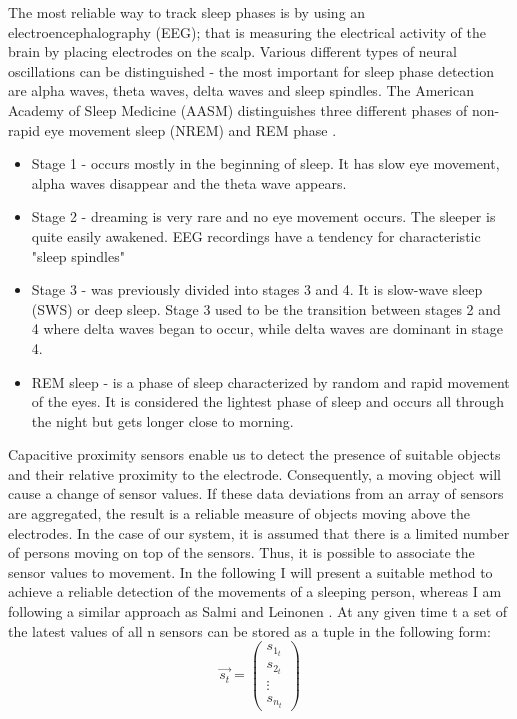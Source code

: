 The most reliable way to track sleep phases is by using an electroencephalography (EEG); that is measuring the electrical activity of the brain by placing electrodes on the scalp. Various different types of neural oscillations can be distinguished - the most important for sleep phase detection are alpha waves, theta waves, delta waves and sleep spindles. The American Academy of Sleep Medicine (AASM) distinguishes three different phases of non-rapid eye movement sleep (NREM) and REM phase \cite{schulz2008rethinking}. 
\begin{itemize}
\item Stage 1 - occurs mostly in the beginning of sleep. It has slow eye movement, alpha waves disappear and the theta wave appears. 
\item Stage 2 - dreaming is very rare and no eye movement occurs. The sleeper is quite easily awakened. EEG recordings have a tendency for characteristic "sleep spindles"
\item Stage 3 - was previously divided into stages 3 and 4. It is slow-wave sleep (SWS) or deep sleep. Stage 3 used to be the transition between stages 2 and 4 where delta waves began to occur, while delta waves are dominant in stage 4. 
\item REM sleep - is a phase of sleep characterized by random and rapid movement of the eyes. It is considered the lightest phase of sleep and occurs all through the night but gets longer close to morning.
\end{itemize}

Capacitive proximity sensors enable us to detect the presence of suitable objects and their relative proximity to the electrode. Consequently, a moving object will cause a change of sensor values. If these data deviations from an array of sensors are aggregated, the result is a reliable measure of objects moving above the electrodes. In the case of our system, it is assumed that there is a limited number of persons moving on top of the sensors. Thus, it is possible to associate the sensor values to movement. In the following I will present a suitable method to achieve a reliable detection of the movements of a sleeping person, whereas I am following a similar approach as Salmi and Leinonen \cite{salmi86}.
At any given time t a set of the latest values of all n sensors can be stored as a tuple in the following form: 
\begin{equation}
\overrightarrow{s_t}=\begin{pmatrix}
s_{1_t}\\ 
s_{2_t}\\ 
\vdots \\ 
s_{n_t}
\end{pmatrix}
\end{equation} 


